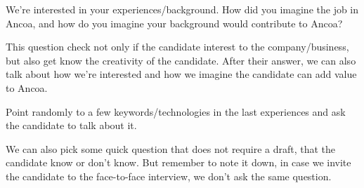 \documentclass[answers]{exam}
\newcommand*{\ANCOACPP}{}%
\begin{document}
\begin{questions}
\question We're interested in your experiences/background. How did you imagine the job in Ancoa, and how do you imagine your background would contribute to Ancoa?
\begin{solution}[.2in]
	This question check not only if the candidate interest to the company/business, but also get know the creativity of the candidate. After their answer, we can also talk about how we're interested and how we imagine the candidate can add value to Ancoa.
\end{solution}

\question Point randomly to a few keywords/technologies in the last experiences and ask the candidate to talk about it.

We can also pick some quick question that does not require a draft, that the candidate know or don't know. But remember to note it down, in case we invite the candidate to the face-to-face interview, we don't ask the same question.
\end{questions}
\fi

\ifdefined\ANCOACPP
\end{document}
